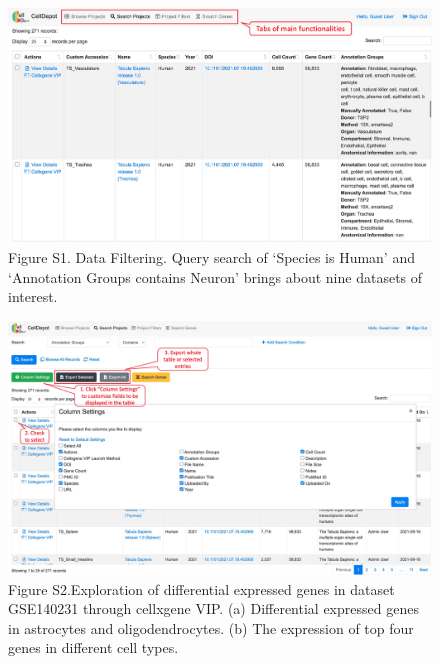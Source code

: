 \documentclass[
  openany]{book}
\begin{document}
\begin{figure}
\centering
\includegraphics{figures/S1.jpg}
\caption{Figure S1. Data Filtering. Query search of `Species is Human' and `Annotation Groups contains Neuron' brings about nine datasets of interest.}
\end{figure}

\begin{figure}
\centering
\includegraphics{figures/S2.jpg}
\caption{Figure S2.Exploration of differential expressed genes in dataset GSE140231 through cellxgene VIP. (a) Differential expressed genes in astrocytes and oligodendrocytes. (b) The expression of top four genes in different cell types.}
\end{figure}
\end{document}
